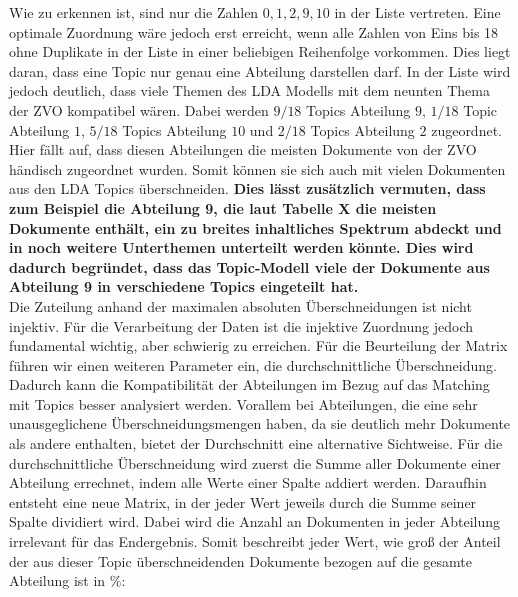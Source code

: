 \documentclass[german,version-2020-11]{uzl-thesis}
\begin{document}
\begin{enumerate}
Wie zu erkennen ist, sind nur die Zahlen $ 0,1,2,9,10 $ in der Liste vertreten. Eine optimale Zuordnung wäre jedoch erst erreicht, wenn alle Zahlen von Eins bis 18 ohne Duplikate in der Liste in einer beliebigen Reihenfolge vorkommen. Dies liegt daran, dass eine Topic nur genau eine Abteilung darstellen darf. In der Liste wird jedoch deutlich, dass viele Themen des LDA Modells mit dem neunten Thema der ZVO kompatibel wären. Dabei werden $9/18$ Topics Abteilung $9$, $1/18$ Topic Abteilung $1$, $5/18$ Topics Abteilung $10$ und $2/18$ Topics Abteilung $2$ zugeordnet. Hier fällt auf, dass diesen Abteilungen die meisten Dokumente von der ZVO händisch zugeordnet wurden. Somit können sie sich auch mit vielen Dokumenten aus den LDA Topics überschneiden. \textbf{Dies lässt zusätzlich vermuten, dass zum Beispiel die Abteilung 9, die laut Tabelle X die meisten Dokumente enthält, ein zu breites inhaltliches Spektrum abdeckt und in noch weitere Unterthemen unterteilt werden könnte. Dies wird dadurch begründet, dass das Topic-Modell viele der Dokumente aus Abteilung 9 in verschiedene Topics eingeteilt hat.}\\


Die Zuteilung anhand der maximalen absoluten Überschneidungen ist nicht injektiv. Für die Verarbeitung der Daten ist die injektive Zuordnung jedoch fundamental wichtig, aber schwierig zu erreichen. Für die Beurteilung der Matrix führen wir einen weiteren Parameter ein, die durchschnittliche Überschneidung. Dadurch kann die Kompatibilität der Abteilungen im Bezug auf das Matching mit Topics besser analysiert werden. Vorallem bei Abteilungen, die eine sehr unausgeglichene Überschneidungsmengen haben, da sie deutlich mehr Dokumente als andere enthalten, bietet der Durchschnitt eine alternative Sichtweise. Für die durchschnittliche Überschneidung wird zuerst die Summe aller Dokumente einer Abteilung errechnet, indem alle Werte einer Spalte addiert werden. Daraufhin entsteht eine neue Matrix, in der jeder Wert jeweils durch die Summe seiner Spalte dividiert wird. Dabei wird die Anzahl an Dokumenten in jeder Abteilung irrelevant für das Endergebnis. Somit beschreibt jeder Wert, wie groß der Anteil der aus dieser Topic überschneidenden Dokumente bezogen auf die gesamte Abteilung ist in $\%$: \\


\end{enumerate}
\end{document}
